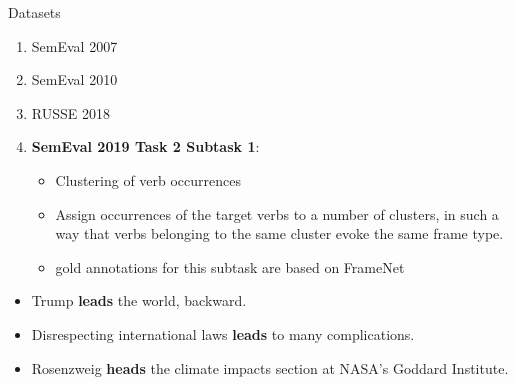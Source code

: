 \begin{frame}{ Datasets }
\vspace{-10pt}

\begin{enumerate}
	\item SemEval 2007 
	\item SemEval 2010
	\item RUSSE 2018
	\item \textbf{SemEval 2019 Task 2 Subtask 1}:  
	\begin{itemize}
		\item Clustering of verb occurrences
		\item Assign occurrences of the target verbs to a number of clusters, in such a way that verbs belonging to the same cluster evoke the same frame type.
		\item gold annotations for this subtask are based on FrameNet
	\end{itemize}
	
\end{enumerate}


\vspace{5pt}

\begin{itemize}
\footnotesize
\item \alert{Trump \textbf{leads} the world, backward.}
\item \textcolor{Cerulean}{Disrespecting international laws \textbf{leads} to many complications.}
\item \alert{Rosenzweig \textbf{heads} the climate impacts section at NASA's Goddard Institute.}
\end{itemize}

\end{frame}



